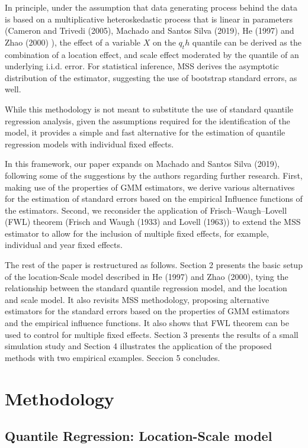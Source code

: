 \documentclass[
  letterpaper,
  DIV=11,
  numbers=noendperiod]{scrartcl}
\begin{document}
In principle, under the assumption that data generating process behind
the data is based on a multiplicative heteroskedastic process that is
linear in parameters (Cameron and Trivedi (2005), Machado and Santos
Silva (2019), He (1997) and Zhao (2000) ), the effect of a variable
\(X\) on the \(q_th\) quantile can be derived as the combination of a
location effect, and scale effect moderated by the quantile of an
underlying i.i.d. error. For statistical inference, MSS derives the
asymptotic distribution of the estimator, suggesting the use of
bootstrap standard errors, as well.

While this methodology is not meant to substitute the use of standard
quantile regression analysis, given the assumptions required for the
identification of the model, it provides a simple and fast alternative
for the estimation of quantile regression models with individual fixed
effects.

In this framework, our paper expands on Machado and Santos Silva (2019),
following some of the suggestions by the authors regarding further
research. First, making use of the properties of GMM estimators, we
derive various alternatives for the estimation of standard errors based
on the empirical Influence functions of the estimators. Second, we
reconsider the application of Frisch--Waugh--Lovell (FWL) theorem
(Frisch and Waugh (1933) and Lovell (1963)) to extend the MSS estimator
to allow for the inclusion of multiple fixed effects, for example,
individual and year fixed effects.

The rest of the paper is restructured as follows. Section 2 presents the
basic setup of the location-Scale model described in He (1997) and Zhao
(2000), tying the relationship between the standard quantile regression
model, and the location and scale model. It also revisits MSS
methodology, proposing alternative estimators for the standard errors
based on the properties of GMM estimators and the empirical influence
functions. It also shows that FWL theorem can be used to control for
multiple fixed effects. Section 3 presents the results of a small
simulation study and Section 4 illustrates the application of the
proposed methods with two empirical examples. Seccion 5 concludes.

\hypertarget{methodology}{%
\section{Methodology}\label{methodology}}

\hypertarget{sec-betas}{%
\subsection{Quantile Regression: Location-Scale model}\label{sec-betas}}
\end{document}
